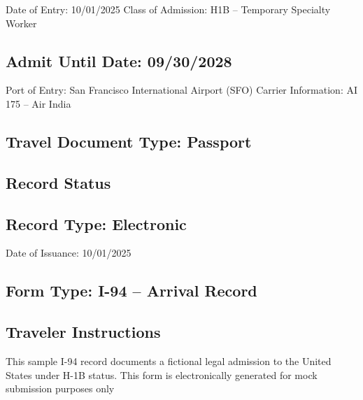 Date of Entry: 10/01/2025 Class of Admission: H1B – Temporary Specialty Worker

\subsection*{Admit Until Date: 09/30/2028}

Port of Entry: San Francisco International Airport (SFO) Carrier Information: AI 175 – Air India

\subsection*{Travel Document Type: Passport}

\subsection*{Record Status}

\subsection*{Record Type: Electronic}

Date of Issuance: 10/01/2025

\subsection*{Form Type: I-94 – Arrival Record}

\subsection*{Traveler Instructions}

This sample I-94 record documents a fictional legal admission to the United States under H-1B status. This form is electronically generated for mock submission purposes only